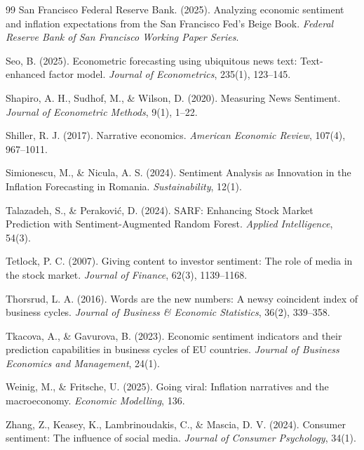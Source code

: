 \documentclass[12pt,oneside]{article}
\begin{document}
\begin{thebibliography}{99}
 San Francisco Federal Reserve Bank. (2025). Analyzing economic sentiment and inflation expectations from the San Francisco Fed's Beige Book. \textit{Federal Reserve Bank of San Francisco Working Paper Series}.

 Seo, B. (2025). Econometric forecasting using ubiquitous news text: Text-enhanced factor model. \textit{Journal of Econometrics}, 235(1), 123--145.

 Shapiro, A. H., Sudhof, M., \& Wilson, D. (2020). Measuring News Sentiment. \textit{Journal of Econometric Methods}, 9(1), 1--22.

 Shiller, R. J. (2017). Narrative economics. \textit{American Economic Review}, 107(4), 967--1011.

 Simionescu, M., \& Nicula, A. S. (2024). Sentiment Analysis as Innovation in the Inflation Forecasting in Romania. \textit{Sustainability}, 12(1).

 Talazadeh, S., \& Peraković, D. (2024). SARF: Enhancing Stock Market Prediction with Sentiment-Augmented Random Forest. \textit{Applied Intelligence}, 54(3).

 Tetlock, P. C. (2007). Giving content to investor sentiment: The role of media in the stock market. \textit{Journal of Finance}, 62(3), 1139--1168.

 Thorsrud, L. A. (2016). Words are the new numbers: A newsy coincident index of business cycles. \textit{Journal of Business \& Economic Statistics}, 36(2), 339--358.

 Tkacova, A., \& Gavurova, B. (2023). Economic sentiment indicators and their prediction capabilities in business cycles of EU countries. \textit{Journal of Business Economics and Management}, 24(1).

 Weinig, M., \& Fritsche, U. (2025). Going viral: Inflation narratives and the macroeconomy. \textit{Economic Modelling}, 136.

 Zhang, Z., Keasey, K., Lambrinoudakis, C., \& Mascia, D. V. (2024). Consumer sentiment: The influence of social media. \textit{Journal of Consumer Psychology}, 34(1).

\end{thebibliography}
\end{document}
